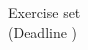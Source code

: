 \documentclass[a4paper]{scrartcl}
\def\header#1#2{
  \begin{center}
    {\Large Exercise set}\\
    {(Deadline #2)}
  \end{center}
}
\begin{document}
\header{Nr. \NUMBER}{\DEADLINE}
\end{document}
